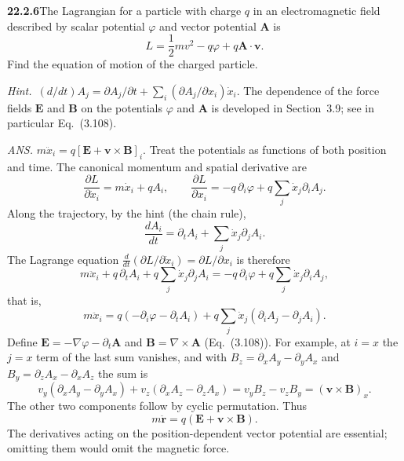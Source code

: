 \par\bigskip
\noindent\textbf{22.2.6}\quad The Lagrangian for a particle with
charge $q$ in an electromagnetic field described by scalar
potential $\varphi$ and vector potential $\mathbf{A}$ is
\[
L=\frac{1}{2}mv^{2}-q\varphi+q\mathbf{A}\cdot\mathbf{v}.
\]
Find the equation of motion of the charged particle.
\par\emph{Hint.}~$(d/dt)A_{j}=\partial A_{j}/\partial t
+\displaystyle\sum_{i}(\partial A_{j}/\partial x_{i})\dot{x}_{i}$.
The dependence of the force fields $\mathbf{E}$ and $\mathbf{B}$
on the potentials $\varphi$ and $\mathbf{A}$ is developed in
Section~3.9; see in particular Eq.~(3.108).
\par\nobreak\hfill\emph{ANS.}\enspace
$m\ddot{x}_{i}=q[\mathbf{E}+\mathbf{v}\times\mathbf{B}]_{i}$.
\solution
Treat the potentials as functions of both position and time. The
canonical momentum and spatial derivative are
\[
\frac{\partial L}{\partial\dot x_i}=m\dot x_i+qA_i,\qquad
\frac{\partial L}{\partial x_i}
=-q\,\partial_i\varphi+q\sum_j\dot x_j\partial_iA_j.
\]
Along the trajectory, by the hint (the chain rule),
\[
\frac{dA_i}{dt}=\partial_tA_i+\sum_j\dot x_j\partial_jA_i.
\]
The Lagrange equation
$\frac d{dt}(\partial L/\partial\dot x_i)=\partial L/\partial x_i$
is therefore
\[
m\ddot x_i+q\,\partial_tA_i+q\sum_j\dot x_j\partial_jA_i
=-q\,\partial_i\varphi+q\sum_j\dot x_j\partial_iA_j,
\]
that is,
\[
m\ddot x_i
=q(-\partial_i\varphi-\partial_tA_i)
+q\sum_j\dot x_j(\partial_iA_j-\partial_jA_i).
\]
Define $\mathbf E=-\nabla\varphi-\partial_t\mathbf A$ and
$\mathbf B=\nabla\times\mathbf A$ (Eq.~(3.108)).
For example, at $i=x$ the $j=x$ term of the last sum vanishes, and
with $B_z=\partial_xA_y-\partial_yA_x$ and
$B_y=\partial_zA_x-\partial_xA_z$ the sum is
\[
v_y(\partial_xA_y-\partial_yA_x)
+v_z(\partial_xA_z-\partial_zA_x)
=v_yB_z-v_zB_y=(\mathbf v\times\mathbf B)_x.
\]
The other two components follow by cyclic permutation. Thus
\[
\boxed{m\ddot{\mathbf r}
=q(\mathbf E+\mathbf v\times\mathbf B)}.
\]
The derivatives acting on the position-dependent vector potential are
essential; omitting them would omit the magnetic force.


